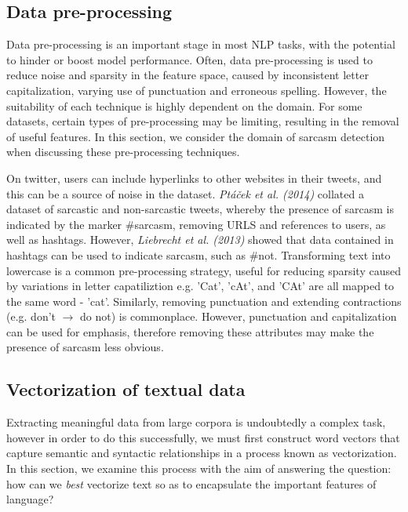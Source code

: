 \documentclass[12pt,a4paper]{article}
\begin{document}
\subsection{Data pre-processing}
\noindent Data pre-processing is an important stage in most NLP tasks, with the potential to hinder or boost model performance. Often, data pre-processing is used to reduce noise and sparsity in the feature space, caused by inconsistent letter capitalization, varying use of punctuation and erroneous spelling. However, the suitability of each technique is highly dependent on the domain. For some datasets, certain types of pre-processing may be limiting, resulting in the removal of useful features. In this section, we consider the domain of sarcasm detection when discussing these pre-processing techniques.

On twitter, users can include hyperlinks to other websites in their tweets, and this can be a source of noise in the dataset. \textit{Pt{\'a}{\v{c}ek et al. (2014)}} \cite{ptavcek2014sarcasm} collated a dataset of sarcastic and non-sarcastic tweets, whereby the presence of sarcasm is indicated by the marker \#sarcasm, removing URLS and references to users, as well as hashtags. However, \textit{Liebrecht et al. (2013)} \cite{liebrecht2013perfect} showed that data contained in hashtags can be used to indicate sarcasm, such as \#not. Transforming text into lowercase is a common pre-processing strategy, useful for reducing sparsity caused by variations in letter capatiliztion e.g. 'Cat', 'cAt', and 'CAt' are all mapped to the same word - 'cat'. Similarly, removing punctuation and extending contractions (e.g. don't $\rightarrow$ do not) is commonplace. However, punctuation and capitalization can be used for emphasis, therefore removing these attributes may make the presence of sarcasm less obvious.
\vfill

\subsection{Vectorization of textual data}
\noindent Extracting meaningful data from large corpora is undoubtedly a complex task, however in order to do this successfully, we must first construct word vectors that capture semantic and syntactic relationships in a process known as vectorization. In this section, we examine this process with the aim of answering the question: how can we \textit{best} vectorize text so as to encapsulate the important features of language?
\end{document}
